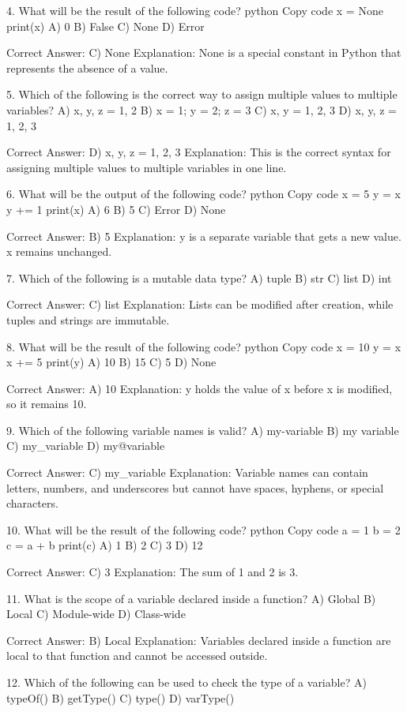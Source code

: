 4. What will be the result of the following code?
python
Copy code
x = None
print(x)
A) 0
B) False
C) None
D) Error

Correct Answer: C) None
Explanation: None is a special constant in Python that represents the absence of a value.

5. Which of the following is the correct way to assign multiple values to multiple variables?
A) x, y, z = 1, 2
B) x = 1; y = 2; z = 3
C) x, y = 1, 2, 3
D) x, y, z = 1, 2, 3

Correct Answer: D) x, y, z = 1, 2, 3
Explanation: This is the correct syntax for assigning multiple values to multiple variables in one line.

6. What will be the output of the following code?
python
Copy code
x = 5
y = x
y += 1
print(x)
A) 6
B) 5
C) Error
D) None

Correct Answer: B) 5
Explanation: y is a separate variable that gets a new value. x remains unchanged.

7. Which of the following is a mutable data type?
A) tuple
B) str
C) list
D) int

Correct Answer: C) list
Explanation: Lists can be modified after creation, while tuples and strings are immutable.

8. What will be the result of the following code?
python
Copy code
x = 10
y = x
x += 5
print(y)
A) 10
B) 15
C) 5
D) None

Correct Answer: A) 10
Explanation: y holds the value of x before x is modified, so it remains 10.

9. Which of the following variable names is valid?
A) my-variable
B) my variable
C) my_variable
D) my@variable

Correct Answer: C) my_variable
Explanation: Variable names can contain letters, numbers, and underscores but cannot have spaces, hyphens, or special characters.

10. What will be the result of the following code?
python
Copy code
a = 1
b = 2
c = a + b
print(c)
A) 1
B) 2
C) 3
D) 12

Correct Answer: C) 3
Explanation: The sum of 1 and 2 is 3.

11. What is the scope of a variable declared inside a function?
A) Global
B) Local
C) Module-wide
D) Class-wide

Correct Answer: B) Local
Explanation: Variables declared inside a function are local to that function and cannot be accessed outside.

12. Which of the following can be used to check the type of a variable?
A) typeOf()
B) getType()
C) type()
D) varType()

